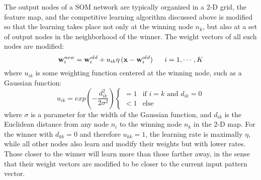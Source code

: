 \documentclass{article}
\begin{document}
\begin{comment}
For example, sound signals of different frequencies are mapped to the 
primary auditory cortex in which neighboring neurons respond to similar 
frequencies. 
Similarly, due to the \htmladdnormallink{retinotopic mapping}
{http://fourier.eng.hmc.edu/e180/lectures/v1/node3.html} in the visual 
system, the visual signals received by the retina are topographically 
mapped to the primary and then subsequent higher visual cortical areas. 
For example, the visual edges/lines of different orientations are also 
mapped to the primary visual cortex where neighboring neurons respond 
to similar orientations.
\htmladdimg{../figures/AuditoryCortex.gif}
\htmladdimg{../figures/VisualCortex.png}
\htmladdimg{../figures/orientationocculardominance.gif}
\htmladdimg{../figures/ColumnarMT.png}
\end{comment}


The output nodes of a SOM network are typically organized in a 2-D 
grid, the feature map, and the competitive learning algorithm discussed 
above is modified so that the learning takes place not only at the winning 
node $n_k$, but also at a set of output nodes in the neighborhood of the 
winner. The weight vectors of all such nodes are modified:
\begin{equation} 
  {\bf w}_i^{new}={\bf w}_i^{old}+u_{ik}\eta \,({\bf x}-{\bf w}_i^{old})
  \;\;\;\;\;\;i=1,\cdots,K 
  \label{SOMweightUpdate}
\end{equation}
where $u_{ik}$ is some weighting function centered at the winning node, 
such as a Gaussian function:
\begin{equation} 
  u_{ik}=exp\left( -\frac{d^2_{ik}}{2\sigma^2} \right)
  \left\{ \begin{array}{ll} =1 & \mbox{if $i=k$ and $d_{ik}=0$}\\
    <1 & \mbox{else }  \end{array}\right.
\end{equation}
where $\sigma$ is a parameter for the width of the Gaussian function, 
and $d_{ik}$ is the Euclidean distance from any node $n_i$ to the winning 
node $n_k$ in the 2-D map. For the winner with $d_{kk}=0$ and therefore 
$u_{kk}=1$, the learning rate is maximally $\eta$, while all other nodes 
also learn and modify their weights but with lower rates. Those closer 
to the winner will learn more than those farther away, in the sense that
their weight vectors are modified to be closer to the current input 
pattern vector. 
\end{document}

